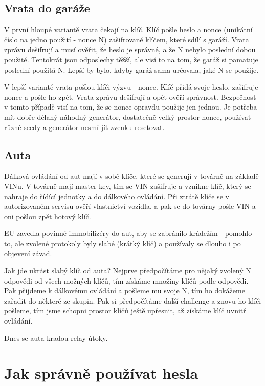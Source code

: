 \subsection{Vrata do garáže}

V první hloupé variantě vrata čekají na klíč. Klíč pošle heslo a nonce (unikátní číslo na jedno použití - nonce N) zašifrované klíčem, které sdílí s garáží. Vrata zprávu dešifrují a musí ověřit, že heslo je správné, a že N nebylo poslední dobou použité. Tentokrát jsou odposlechy těžší, ale visí to na tom, že garáž si pamatuje poslední použitá N. Lepší by bylo, kdyby garáž sama určovala, jaké N se použije.

V lepší variantě vrata pošlou klíči výzvu - nonce. Klíč přidá svoje heslo, zašifruje nonce a pošle ho zpět. Vrata zprávu dešifrují a opět ověří správnost. Bezpečnost v tomto případě visí na tom, že se nonce opravdu použije jen jednou. Je potřeba mít dobře dělaný náhodný generátor, dostatečně velký prostor nonce, používat různé seedy a generátor nesmí jít zvenku resetovat.

\subsection{Auta}

Dálková ovládání od aut mají v sobě klíče, které se generují v továrně na základě VINu. V továrně mají master key, tím se VIN zašifruje a vznikne klíč, který se nahraje do řídící jednotky a do dálkového ovládání. Při ztrátě klíče se v autorizovaném servisu ověří vlastnictví vozidla, a pak se do továrny pošle VIN a oni pošlou zpět hotový klíč.

EU zavedla povinné immobilizéry do aut, aby se zabránilo krádežím - pomohlo to, ale zvolené protokoly byly slabé (krátký klíč) a používaly se dlouho i po objevení závad. 

Jak jde ukrást slabý klíč od auta? Nejprve předpočítáme pro nějaký zvolený N odpovědi od všech možných klíčů, tím získáme množiny klíčů podle odpovědi. Pak přijdeme k dálkovému ovládání a pošleme mu svoje N, tím ho dokážeme zařadit do některé ze skupin. Pak si předpočítáme další challenge a znovu ho klíči pošleme, tím jsme schopni prostor klíčů ještě upřesnit, až získáme klíč uvnitř ovládání.

Dnes se auta kradou relay útoky.



\section{Jak správně používat hesla}

